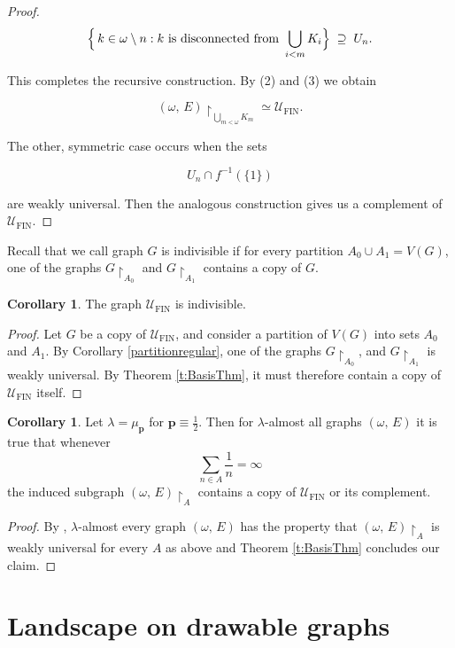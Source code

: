 \documentclass{amsart}
\theoremstyle{plain}
\theoremstyle{definition}
\newtheorem{cor}[theorem]{Corollary}
\theoremstyle{remark}
\numberwithin{equation}{section}
\newcommand{\UU}{\mathcal{U}}
\DeclareMathOperator{\fin}{FIN}
\begin{document}
\begin{proof}
\[
\Bigl\{\,k \in \omega\setminus n : k \text{ is disconnected from } \bigcup_{i<m} K_{i}\Bigr\}
\;\supseteq\; U_{n}.
\]


This completes the recursive construction.  
By (2) and (3) we obtain


$$(\omega,\, E)\restriction_{\bigcup\limits_{m<\omega}K_m} \simeq \UU_{\fin}.$$



The other, symmetric case occurs when the sets


\[
U_{n}\cap f^{-1}(\{1\})
\]


are weakly universal.  Then the analogous construction gives us a complement of $\UU_{\fin}$.
\end{proof}
Recall that we call graph $G$ is indivisible if for every partition $A_0\cup A_1 =V(G)$, one of the graphs $G\restriction_{A_0}$ and $G\restriction_{A_1}$ contains a copy of $G$.

\begin{cor}\label{indivisible}
The graph \(\UU_{\fin}\) is indivisible.
\end{cor}
\begin{proof}
    Let $G$ be a copy of \(\UU_{\fin}\), and consider a partition of $V(G)$ into sets $A_0$ and $A_1$. By Corollary \ref{partitionregular}, one of the graphs $G\restriction_{A_0}$, and $G\restriction_{A_1}$ is weakly universal. By Theorem \ref{t:BasisThm}, it must therefore contain a copy of \(\UU_{\fin}\) itself.
\end{proof}

\begin{cor}
    Let $\lambda=\mu_{\mathbf{p}}$ for $\mathbf{p} \equiv \frac{1}{2}$.  Then for $\lambda$-almost all graphs $(\omega,\, E)$ it is true that whenever
    $$\sum\limits_{n\in A}\frac{1}{n}=\infty$$
   the  induced subgraph $(\omega,\, E) \restriction_A$ contains a copy of $\UU_{\fin}$ or its complement.
\end{cor}
\begin{proof}
By \cite[Theorem 1.2]{brian2018subsets}, $\lambda$-almost every graph $(\omega,\, E)$ has the property that $(\omega,\, E)\restriction_A$ is weakly universal for every $A$ as above and Theorem \ref{t:BasisThm} concludes our claim. 
\end{proof}

\section{Landscape on drawable graphs}\label{section Landscape on drawable graphs}
\end{document}
